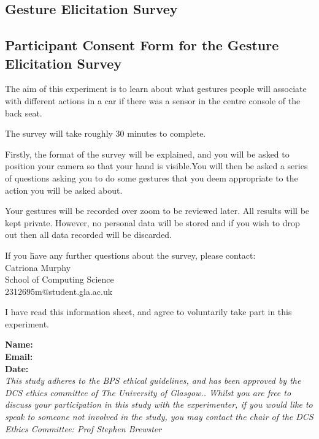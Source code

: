 \documentclass{l4proj}
\begin{document}
\begin{appendices}

\chapter{Gesture Elicitation Survey}

\section{Participant Consent Form for the Gesture Elicitation Survey}
\label{section:ConsentGE}
The aim of this experiment is to learn about what gestures people will associate with different actions in a car if there was a sensor in the centre console of the back seat.

The survey will take roughly 30 minutes to complete.

Firstly, the format of the survey will be explained, and you will be asked to position your camera so that your hand is visible.You will then be asked a series of questions asking you to do some gestures that you deem appropriate to the action you will be asked about.  

Your gestures will be recorded over zoom to be reviewed later. All results will be kept private. However, no personal data will be stored and if you wish to drop out then all data recorded will be discarded. 

\begin{tabbing}
If you \=have any further questions about the survey, please contact:\\
\> Catriona Murphy\\

\>School of Computing Science\\

\>2312695m@student.gla.ac.uk\\

\end{tabbing}


I have read this information sheet, and agree to voluntarily take part in this experiment.

\textbf{Name:}\\
\textbf{Email:}\\
\textbf{Date:}\\

\emph{This study adheres to the BPS ethical guidelines, and has been approved by the DCS ethics committee of The University of Glasgow.. Whilst you are free to discuss your participation in this study with the experimenter, if you would like to speak to someone not involved in the study, you may contact the chair of the DCS Ethics Committee: Prof Stephen Brewster}



\end{appendices}
\end{document}
